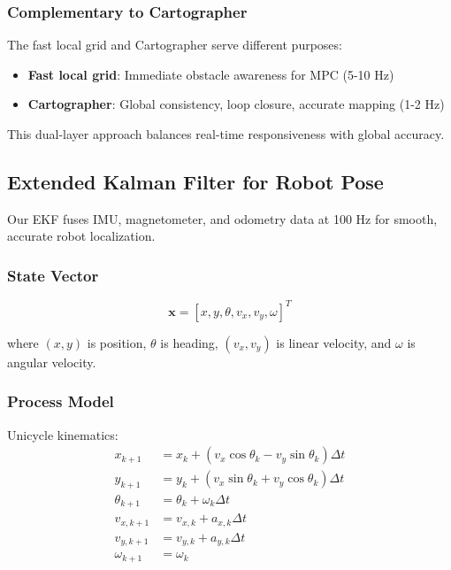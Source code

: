 \documentclass[11pt,a4paper]{article}
\begin{document}
\subsubsection{Complementary to Cartographer}

The fast local grid and Cartographer serve different purposes:
\begin{itemize}
    \item \textbf{Fast local grid}: Immediate obstacle awareness for MPC (5-10 Hz)
    \item \textbf{Cartographer}: Global consistency, loop closure, accurate mapping (1-2 Hz)
\end{itemize}

This dual-layer approach balances real-time responsiveness with global accuracy.

\subsection{Extended Kalman Filter for Robot Pose}

Our EKF fuses IMU, magnetometer, and odometry data at 100 Hz for smooth, accurate robot localization.

\subsubsection{State Vector}

\begin{equation}
\mathbf{x} = [x, y, \theta, v_x, v_y, \omega]^T
\end{equation}

where $(x,y)$ is position, $\theta$ is heading, $(v_x, v_y)$ is linear velocity, and $\omega$ is angular velocity.

\subsubsection{Process Model}

Unicycle kinematics:
\begin{align}
x_{k+1} &= x_k + (v_x \cos\theta_k - v_y \sin\theta_k) \Delta t \nonumber \\
y_{k+1} &= y_k + (v_x \sin\theta_k + v_y \cos\theta_k) \Delta t \nonumber \\
\theta_{k+1} &= \theta_k + \omega_k \Delta t \nonumber \\
v_{x,k+1} &= v_{x,k} + a_{x,k} \Delta t \nonumber \\
v_{y,k+1} &= v_{y,k} + a_{y,k} \Delta t \nonumber \\
\omega_{k+1} &= \omega_k \nonumber
\end{align}
\end{document}
